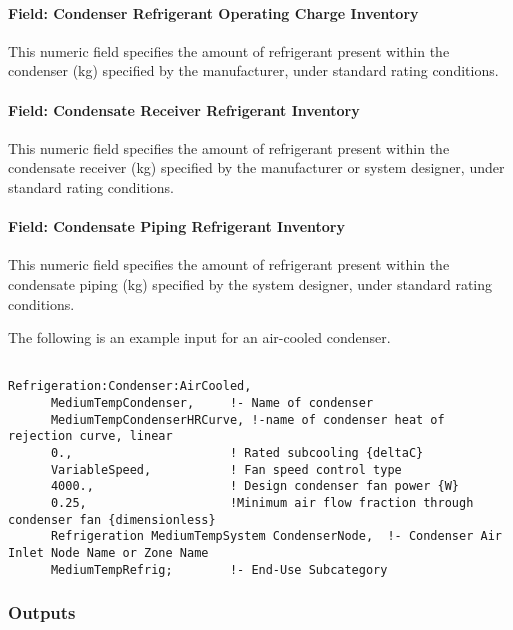 \paragraph{Field: Condenser Refrigerant Operating Charge Inventory}\label{field-condenser-refrigerant-operating-charge-inventory}

This numeric field specifies the amount of refrigerant present within the condenser (kg) specified by the manufacturer, under standard rating conditions.

\paragraph{Field: Condensate Receiver Refrigerant Inventory}\label{field-condensate-receiver-refrigerant-inventory}

This numeric field specifies the amount of refrigerant present within the condensate receiver (kg) specified by the manufacturer or system designer, under standard rating conditions.

\paragraph{Field: Condensate Piping Refrigerant Inventory}\label{field-condensate-piping-refrigerant-inventory}

This numeric field specifies the amount of refrigerant present within the condensate piping (kg) specified by the system designer, under standard rating conditions.

The following is an example input for an air-cooled condenser.

\begin{lstlisting}

Refrigeration:Condenser:AirCooled,
      MediumTempCondenser,     !- Name of condenser
      MediumTempCondenserHRCurve, !-name of condenser heat of rejection curve, linear
      0.,                      ! Rated subcooling {deltaC}
      VariableSpeed,           ! Fan speed control type
      4000.,                   ! Design condenser fan power {W}
      0.25,                    !Minimum air flow fraction through condenser fan {dimensionless}
      Refrigeration MediumTempSystem CondenserNode,  !- Condenser Air Inlet Node Name or Zone Name
      MediumTempRefrig;        !- End-Use Subcategory
\end{lstlisting}

\subsubsection{Outputs}\label{outputs-6-008}

